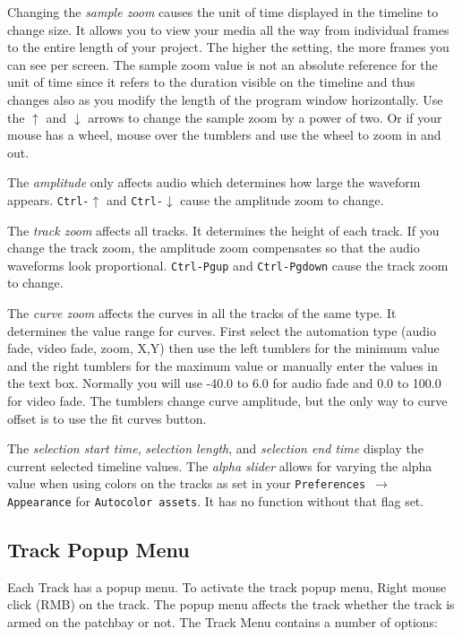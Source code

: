 Changing the \emph{sample zoom} causes the unit of time displayed in the timeline to change size. 
It allows you to view your media all the way from individual frames to the entire length of your project. 
The higher the setting, the more frames you can see per screen. 
The sample zoom value is not an absolute reference for the unit of time since it refers to the duration visible on the timeline and thus changes also as you modify the length of the program window horizontally.
Use the $\uparrow$ and $\downarrow$ arrows to change the sample zoom by a power of two. 
Or if your mouse has a wheel, mouse over the tumblers and use the wheel to zoom in and out.


The \emph{amplitude} only affects audio which determines how large the waveform appears. \texttt{Ctrl-$\uparrow$} and \texttt{Ctrl-$\downarrow$} cause the amplitude zoom to change.

The \emph{track zoom} affects all tracks. 
It determines the height of each track. 
If you change the track zoom, the amplitude zoom compensates so that the audio waveforms look proportional. 
\texttt{Ctrl-Pgup} and \texttt{Ctrl-Pgdown} cause the track zoom to change.

The \emph{curve zoom} affects the curves in all the tracks of the same type. 
It determines the value range for curves. 
First select the automation type (audio fade, video fade, zoom, X,Y) then use the left tumblers for the minimum value and the right tumblers for the maximum value or manually enter the values in the text box. 
Normally you will use -40.0 to 6.0 for audio fade and 0.0 to 100.0 for video fade. 
The tumblers change curve amplitude, but the only way to curve offset is to use the fit curves button.

The \emph{selection start time}, \emph{selection length}, and \emph{selection end time} display the current selected timeline values.  
The \emph{alpha slider} allows for varying the alpha value when using colors on the tracks as set in your \texttt{Preferences $\rightarrow$ Appearance} for \texttt{Autocolor assets}.  
It has no function without that flag set.

\subsection{Track Popup Menu}%
\label{sub:track_popup_menu}

Each Track has a popup menu. 
To activate the track popup menu, Right mouse click (RMB) on the track. 
The popup menu affects the track whether the track is armed on the patchbay or not. 
The Track Menu contains a number of options:

